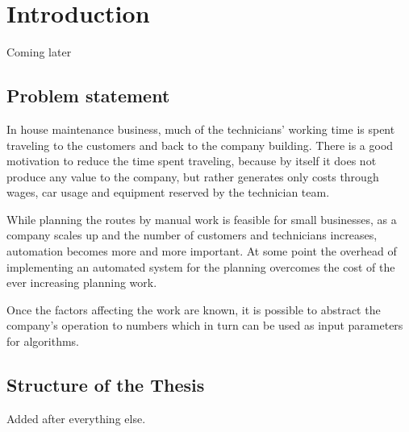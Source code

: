\chapter{Introduction}
\label{chapter:intro}

Coming later

\section{Problem statement}
In house maintenance business, much of the technicians' working time is spent traveling to the customers and back to the company building. There is a good motivation to reduce the time spent traveling, because by itself it does not produce any value to the company, but rather generates only costs through wages, car usage and equipment reserved by the technician team. 

While planning the routes by manual work is feasible for small businesses, as a company scales up and the number of customers and technicians increases, automation becomes more and more important. At some point the overhead of implementing an automated system for the planning overcomes the cost of the ever increasing planning work. 

Once the factors affecting the work are known, it is possible to abstract the company's operation to numbers which in turn can be used as input parameters for algorithms.

\section{Structure of the Thesis}
Added after everything else.